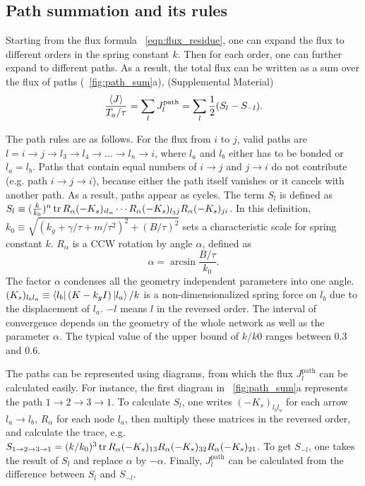 \documentclass[
 preprint,
 preprintnumbers,
 amsmath,amssymb,
 aps,
 pre,
 longbibliography,
 superscriptaddress,
 10pt, twocolumn
]{revtex4-1}
\begin{document}
\subsection{Path summation and its rules}
Starting from the flux formula \eqnname~\eqref{eqn:flux_residue}, one can expand the flux to different orders in the spring constant $k$. Then for each order, one can further expand to different paths.
As a result, the total flux can be written as a sum over the flux of paths (\figurename~\ref{fig:path_sum}a), (Supplemental Material)
\begin{equation} \label{eqn:flux_path}
    \frac{\expval{J}}{T_a/\tau} = \sum_l J^\text{path}_l = \sum_l \frac{1}{2}(S_l - S_{-l}).
\end{equation}

The path rules are as follows.
For the flux from $i$ to $j$, valid paths are $l=i\rightarrow j\rightarrow l_3\rightarrow l_4\rightarrow \dots \rightarrow l_n\rightarrow i$, where $l_a$ and $l_b$ either has to be bonded or $l_a=l_b$. Paths that contain equal numbers of $i\rightarrow j$ and $j\rightarrow i$ do not contribute (e.g. path $i\rightarrow j\rightarrow i$), because either the path itself vanishes or it cancels with another path. As a result, paths appear as cycles.
The term $S_l$ is defined as $S_l \equiv (\frac{k}{k_0})^n \tr R_\alpha (-K_s)_{i l_n} \cdots R_\alpha (-K_s)_{l_3j} R_\alpha (-K_s)_{ji}$.
In this definition, $k_0\equiv \sqrt{(k_g+\gamma/\tau+m/\tau^2)^2 + (B/\tau)^2}$ sets a characteristic scale for spring constant $k$. $R_\alpha$ is a CCW rotation by angle $\alpha$, defined as
\begin{equation} \label{eqn:path_alpha_def}
    \alpha = \arcsin{\frac{B/\tau}{k_0}}.
\end{equation}
The factor $\alpha$ condenses all the geometry independent parameters into one angle.
$(K_s)_{l_b l_a} \equiv \bra{l_b}(K-k_gI)\ket{l_a} / k$ is a non-dimensionalized spring force on $l_b$ due to the displacement of $l_a$.
$-l$ means $l$ in the reversed order.
The interval of convergence depends on the geometry of the whole network as well as the parameter $\alpha$. The typical value of the upper bound of $k/k0$ ranges between $0.3$ and $0.6$.

The paths can be represented using diagrams, from which the flux $J^\text{path}_l$ can be calculated easily. For instance, the first diagram in \figurename~\ref{fig:path_sum}a represents the path $1\rightarrow 2\rightarrow 3\rightarrow 1$. To calculate $S_l$, one writes $(-K_s)_{l_bl_a}$ for each arrow $l_a\rightarrow l_b$, $R_\alpha$ for each node $l_a$, then multiply these matrices in the reversed order, and calculate the trace, e.g. $S_{1\rightarrow 2\rightarrow 3\rightarrow 1} = (k/k_0)^3 \tr R_\alpha (-K_s)_{13} R_\alpha (-K_s)_{32} R_\alpha (-K_s)_{21}$. To get $S_{-l}$, one takes the result of $S_l$ and replace $\alpha$ by $-\alpha$. Finally, $J^\text{path}_l$ can be calculated from the difference between $S_l$ and $S_{-l}$.
\end{document}
